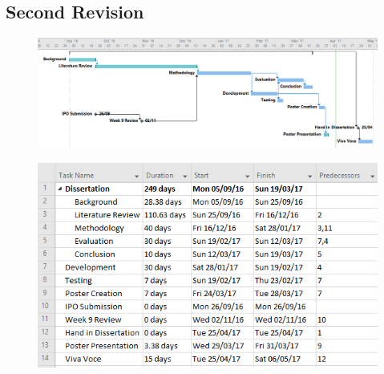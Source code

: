 	\subsection{Second Revision}
		\begin{figure}[h!]
			\includegraphics[width=\textwidth]{../images/gantt/v2/gantt.PNG}
		\end{figure}
		\begin{figure}[h!]
			\includegraphics[]{../images/gantt/v2/tasks.PNG}
		\end{figure}
	\clearpage
